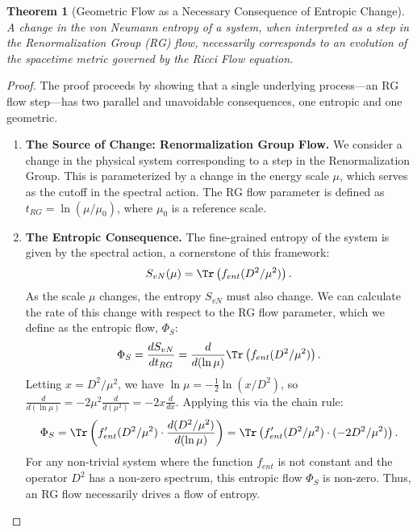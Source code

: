 \documentclass[11pt, letterpaper]{report}
\theoremstyle{plain} %
\newtheorem{theorem}{Theorem}[chapter]
\theoremstyle{definition} %
\theoremstyle{remark} %
\begin{document}
\begin{theorem}[Geometric Flow as a Necessary Consequence of Entropic Change]
\label{thm:geometric_from_entropic}
A change in the von Neumann entropy of a system, when interpreted as a step in the Renormalization Group (RG) flow, necessarily corresponds to an evolution of the spacetime metric governed by the Ricci Flow equation.
\end{theorem}
\begin{proof}
The proof proceeds by showing that a single underlying process—an RG flow step—has two parallel and unavoidable consequences, one entropic and one geometric.

\begin{enumerate}
    \item \textbf{The Source of Change: Renormalization Group Flow.} We consider a change in the physical system corresponding to a step in the Renormalization Group. This is parameterized by a change in the energy scale $\mu$, which serves as the cutoff in the spectral action. The RG flow parameter is defined as $t_{RG} = \ln(\mu / \mu_0)$, where $\mu_0$ is a reference scale.

    \item \textbf{The Entropic Consequence.} The fine-grained entropy of the system is given by the spectral action, a cornerstone of this framework:
    \begin{equation}
        S_{vN}(\mu) = \Tr\left( f_{ent}(D^2/\mu^2) \right).
        \label{eq:svn_spectral_mu}
    \end{equation}
    As the scale $\mu$ changes, the entropy $S_{vN}$ must also change. We can calculate the rate of this change with respect to the RG flow parameter, which we define as the entropic flow, $\Phi_S$:
    \begin{equation}
        \Phi_S = \frac{dS_{vN}}{dt_{RG}} = \frac{d}{d(\ln\mu)} \Tr\left( f_{ent}(D^2/\mu^2) \right).
    \end{equation}
    Letting $x = D^2/\mu^2$, we have $\ln\mu = -\frac{1}{2}\ln(x/D^2)$, so $\frac{d}{d(\ln\mu)} = -2\mu^2 \frac{d}{d(\mu^2)} = -2x \frac{d}{dx}$. Applying this via the chain rule:
    \begin{equation}
        \Phi_S = \Tr\left( f'_{ent}(D^2/\mu^2) \cdot \frac{d(D^2/\mu^2)}{d(\ln\mu)} \right) = \Tr\left( f'_{ent}(D^2/\mu^2) \cdot (-2 D^2/\mu^2) \right).
        \label{eq:entropic_flow_explicit}
    \end{equation}
    For any non-trivial system where the function $f_{ent}$ is not constant and the operator $D^2$ has a non-zero spectrum, this entropic flow $\Phi_S$ is non-zero. Thus, an RG flow necessarily drives a flow of entropy.


\end{enumerate}
\end{proof}
\end{document}

